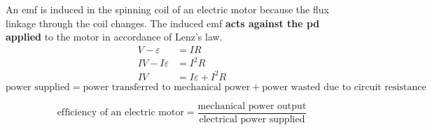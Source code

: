 An emf is induced in the spinning coil of an electric motor because the flux linkage through the coil changes. The induced emf \textbf{acts against the pd applied} to the motor in accordance of Lenz's law.
\begin{align*}
    V-\varepsilon&=IR\\
    IV-I\varepsilon&=I^2R\\
    IV&=I\varepsilon+I^2R
\end{align*}
$$\text{power supplied}=\text{power transferred to mechanical power}+\text{power wasted due to circuit resistance}$$

$$\text{efficiency of an electric motor}=\frac{\text{mechanical power output}}{\text{electrical power supplied}}$$
